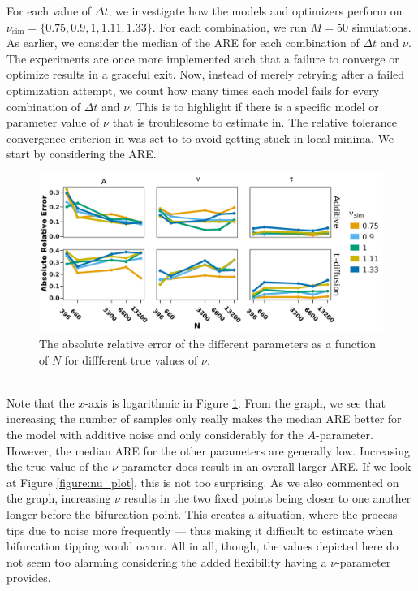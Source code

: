 For each value of $\Delta t$, we investigate how the models and optimizers perform on $\nu_{\mathrm{sim}} = \{0.75, 0.9, 1, 1.11, 1.33\}$. For each combination, we run $M = 50$ simulations. As earlier, we consider the median of the ARE for each combination of $\Delta t$ and $\nu$. The experiments are once more implemented such that a failure to converge or optimize results in a graceful exit. Now, instead of merely retrying after a failed optimization attempt, we count how many times each model fails for every combination of $\Delta t$ and $\nu$. This is to highlight if there is a specific model or parameter value of $\nu$ that is troublesome to estimate in. The relative tolerance convergence criterion in  was set to  to avoid getting stuck in local minima. 
\noindent We start by considering the ARE.
\begin{figure}[h!]
    \begin{center}
        \includegraphics[scale = .11]{figures/combined_nus_plot.jpeg}
        \caption{The absolute relative error of the different parameters as a function of $N$ for diffferent true values of $\nu$.}
        \label{figure:ARE_nu_plots}
    \end{center}
\end{figure}\\
Note that the $x$-axis is logarithmic in Figure \ref{figure:ARE_nu_plots}. From the graph, we see that increasing the number of samples only really makes the median ARE better for the model with additive noise and only considerably for the $A$-parameter. However, the median ARE for the other parameters are generally low. Increasing the true value of the $\nu$-parameter does result in an overall larger ARE. If we look at Figure \ref{figure:nu_plot}, this is not too surprising. As we also commented on the graph, increasing $\nu$ results in the two fixed points being closer to one another longer before the bifurcation point. This creates a situation, where the process tips due to noise more frequently — thus making it difficult to estimate when bifurcation tipping would occur. All in all, though, the values depicted here do not seem too alarming considering the added flexibility having a $\nu$-parameter provides. 
